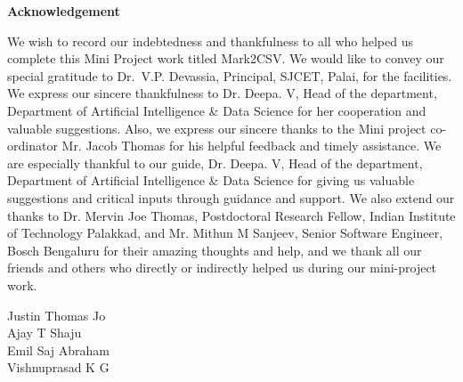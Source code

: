\thispagestyle{empty}
\begin{center}
  \vspace*{1cm}
  \textbf{\large Acknowledgement}
\end{center}
We wish to record our indebtedness and thankfulness to all who helped us complete this Mini Project work titled Mark2CSV. We would like to convey our special gratitude to Dr.~V.P. Devassia, Principal, SJCET, Palai, for the facilities. We express our sincere thankfulness to Dr. Deepa. V, Head of the department, Department of Artificial Intelligence \& Data Science for her cooperation and valuable suggestions. Also, we express our sincere thanks to the Mini project co-ordinator Mr. Jacob Thomas for his helpful feedback and timely assistance.
We are especially thankful to our guide, Dr. Deepa. V, Head of the department, Department of Artificial Intelligence \& Data Science for giving us valuable suggestions and critical inputs through guidance and support. We also extend our thanks to Dr. Mervin Joe Thomas, Postdoctoral Research Fellow, Indian Institute of Technology Palakkad, and Mr. Mithun M Sanjeev, Senior Software Engineer, Bosch Bengaluru for their amazing thoughts and help, and we thank all our friends and others who directly or indirectly helped us during our mini-project work.
 \\
\begin{flushright}
Justin Thomas Jo \\   
Ajay T Shaju \\
Emil Saj Abraham \\
Vishnuprasad K G
\end{flushright}






\newpage %

